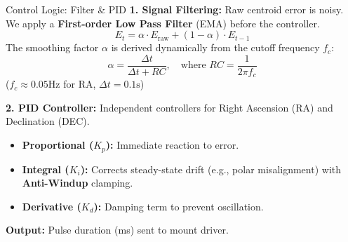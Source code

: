 \begin{frame}{Control Logic: Filter \& PID}
    \textbf{1. Signal Filtering:}
    Raw centroid error is noisy. We apply a \textbf{First-order Low Pass Filter} (EMA) before the controller.
    \[
        E_{t} = \alpha \cdot E_{\text{raw}} + (1 - \alpha) \cdot E_{t-1}
    \]
    The smoothing factor $\alpha$ is derived dynamically from the cutoff frequency $f_c$:
    \[
        \alpha = \frac{\Delta t}{\Delta t + RC}, \quad \text{where } RC = \frac{1}{2\pi f_c}
    \]
    \small ($f_c \approx 0.05\text{Hz}$ for RA, $\Delta t = 0.1\text{s}$)
    \normalsize
    
    \vspace{0.2cm}
    \textbf{2. PID Controller:}
    Independent controllers for Right Ascension (RA) and Declination (DEC).
    \begin{itemize}
        \item \textbf{Proportional ($K_p$):} Immediate reaction to error.
        \item \textbf{Integral ($K_i$):} Corrects steady-state drift (e.g., polar misalignment) with \textbf{Anti-Windup} clamping.
        \item \textbf{Derivative ($K_d$):} Damping term to prevent oscillation.
    \end{itemize}
    
    \vspace{0.2cm}
    \textbf{Output:} Pulse duration (ms) sent to mount driver.
\end{frame}


